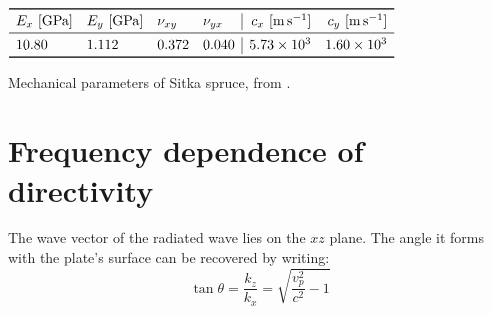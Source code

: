 \documentclass[a4paper]{article}
\begin{document}
\begin{table}[h]
	\centering
	$\begin{array}{llll|rr}
		\toprule
		E_x~[\si{\giga\pascal]}& E_y~[\si{\giga\pascal}] & \nu_{xy} & \nu_{yx} & c_x~[\si{\meter\per\second}] &  c_y~[\si{\meter\per\second}]\\
		\midrule
		10.80 & 1.112 & 0.372 & 0.040 & 5.73\times10^3 & 1.60\times10^3\\
		\bottomrule
	\end{array}$
	\caption{Mechanical parameters of Sitka spruce, from \cite{wood}.}
	\label{tab:wood}
\end{table}

\section{Frequency dependence of directivity}

The wave vector of the radiated wave lies on the $xz$ plane. The angle it forms with the plate's surface can be recovered by writing:
$$ \tan \theta = \frac{k_z}{k_x} = \sqrt{\frac{v_p^2}{c^2} - 1} $$

\printbibliography
\end{document}
